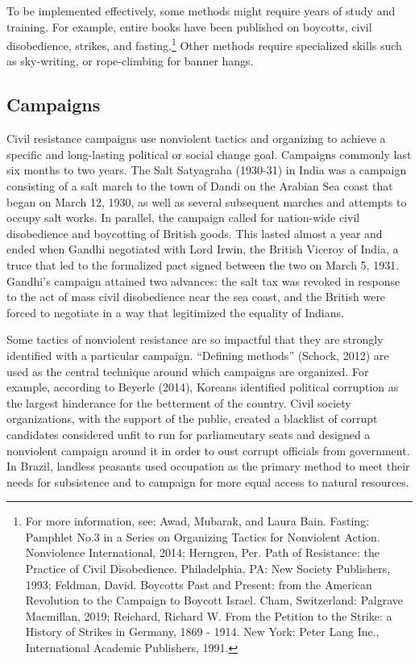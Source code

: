 \documentclass[twoside,a4paper,12pt,fleqn,openany]{extbook}
\begin{document}
To be implemented effectively, some methods might require years of study and training. For example, entire books have been published on boycotts, civil disobedience, strikes, and fasting.\footnote{For more information, see: Awad, Mubarak, and Laura Bain. Fasting: Pamphlet No.3 in a Series on Organizing Tactics for Nonviolent Action. Nonviolence International, 2014; Herngren, Per. Path of Resistance: the Practice of Civil Disobedience. Philadelphia, PA: New Society Publishers, 1993; Feldman, David. Boycotts Past and Present: from the American Revolution to the Campaign to Boycott Israel. Cham, Switzerland: Palgrave Macmillan, 2019; Reichard, Richard W. From the Petition to the Strike: a History of Strikes in Germany, 1869 - 1914. New York: Peter Lang Inc., International Academic Publishers, 1991.} Other methods require specialized skills such as sky-writing, or rope-climbing for banner hangs.

\subsection*{Campaigns}

Civil resistance campaigns use nonviolent tactics and organizing to achieve a specific and long-lasting political or social change goal. Campaigns commonly last six months to two years. The Salt Satyagraha (1930-31) in India was a campaign consisting of a salt march to the town of Dandi on the Arabian Sea coast that began on March 12, 1930, as well as several subsequent marches and attempts to occupy salt works. In parallel, the campaign called for nation-wide civil disobedience and boycotting of British goods. This lasted almost a year and ended when Gandhi negotiated with Lord Irwin, the British Viceroy of India, a truce that led to the formalized pact signed between the two on March 5, 1931. Gandhi’s campaign attained two advances: the salt tax was revoked in response to the act of mass civil disobedience near the sea coast, and the British were forced to negotiate in a way that legitimized the equality of Indians.

Some tactics of nonviolent resistance are so impactful that they are strongly identified with a particular campaign. “Defining methods” (Schock, 2012) are used as the central technique around which campaigns are organized. For example, according to Beyerle (2014), Koreans identified political corruption as the largest hinderance for the betterment of the country. Civil society organizations, with the support of the public, created a blacklist of corrupt candidates considered unfit to run for parliamentary seats and designed a nonviolent campaign around it in order to oust corrupt officials from government. In Brazil, landless peasants used occupation as the primary method to meet their needs for subsistence and to campaign for more equal access to natural resources.
\end{document}

